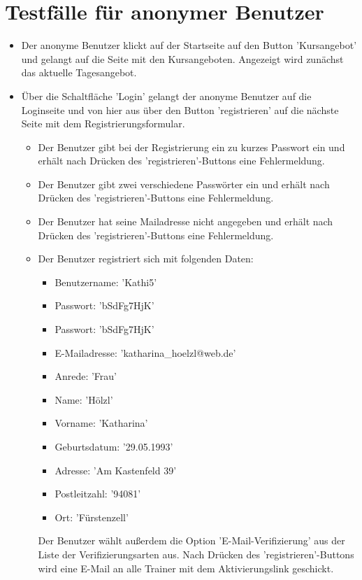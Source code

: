 \documentclass[a4paper]{scrreprt}
\newcounter{Lc}
\newcounter{Hc}
\newcommand{\stepHc}{\stepcounter{Hc}\setcounter{Lc}{0}}
\begin{document}
			
	\section{Testfälle für anonymer Benutzer}
			\stepHc
			\begin{itemize}
				\item {} 
				Der anonyme Benutzer klickt auf der Startseite auf den Button 'Kursangebot'	und gelangt auf die Seite mit den Kursangeboten. Angezeigt wird zunächst das aktuelle Tagesangebot.	
				\item {} 
				Über die Schaltfläche 'Login' gelangt der anonyme Benutzer auf die Loginseite und von hier aus über den Button 'registrieren' auf die nächste Seite mit dem Registrierungsformular. 		
				\begin{itemize}
					\item Der Benutzer gibt bei der Registrierung ein zu kurzes Passwort ein und erhält nach Drücken des 'registrieren'-Buttons eine Fehlermeldung.	
					\item Der Benutzer gibt zwei verschiedene Passwörter ein und erhält nach Drücken des 'registrieren'-Buttons eine Fehlermeldung.
					\item Der Benutzer hat seine Mailadresse nicht angegeben und erhält nach Drücken des 'registrieren'-Buttons eine Fehlermeldung.	
					\item Der Benutzer registriert sich mit folgenden Daten: 
						\begin{itemize}
							\item Benutzername: 'Kathi5'
							\item Passwort: 'bSdFg7HjK'
							\item Passwort: 'bSdFg7HjK'
							\item E-Mailadresse: 'katharina\_hoelzl@web.de'
							\item Anrede: 'Frau'
							\item Name: 'Hölzl'
							\item Vorname: 'Katharina'
							\item Geburtsdatum: '29.05.1993'
							\item Adresse: 'Am Kastenfeld 39'
							\item Postleitzahl: '94081'
							\item Ort: 'Fürstenzell'
						\end{itemize}
					Der Benutzer wählt außerdem die Option 'E-Mail-Verifizierung' aus der Liste der Verifizierungsarten aus. Nach Drücken des 'registrieren'-Buttons wird eine E-Mail an alle Trainer mit dem Aktivierungslink geschickt.
				\end{itemize}
			\end{itemize}	
		
\end{document}
